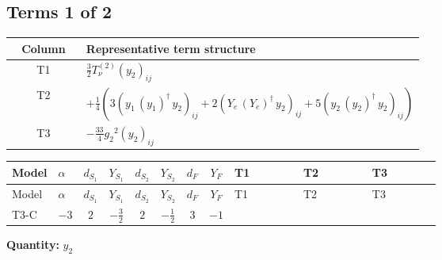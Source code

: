 \documentclass[8pt]{article}
\begin{document}
\begin{landscape}
\subsection*{Terms 1 of 2}
\begin{center}
\begin{tabular}{@{}c >{\raggedright\arraybackslash}p{0.82\linewidth}@{}}
\toprule
Column & Representative term structure \\
\midrule
T1 & \(\displaystyle \frac{3}{2} T_{\nu}^{(2)} \left({y_2}\right)_{ij}\) \\
\midrule
T2 & \(\displaystyle +\frac{1}{4} (3 \left({y_1}\,\left({y_1}\right)^{\dagger}\,{y_2}\right)_{ij}+2 \left({Y_e}\,\left({Y_e}\right)^{\dagger}\,{y_2}\right)_{ij}+5 \left({y_2}\,\left({y_2}\right)^{\dagger}\,{y_2}\right)_{ij})\) \\
\midrule
T3 & \(\displaystyle -\frac{33}{4} {g_2}^2 \left({y_2}\right)_{ij}\) \\
\midrule
\bottomrule
\end{tabular}
\end{center}
\smallskip
\tiny
\begin{longtable}{@{}llcccccc >{\raggedright\arraybackslash}p{0.21\linewidth} >{\raggedright\arraybackslash}p{0.21\linewidth} >{\raggedright\arraybackslash}p{0.21\linewidth}@{}}
\toprule
Model & $\alpha$ & $d_{S_1}$ & $Y_{S_1}$ & $d_{S_2}$ & $Y_{S_2}$ & $d_F$ & $Y_F$ & T1 & T2 & T3 \\
\midrule
\endfirsthead
\toprule
Model & $\alpha$ & $d_{S_1}$ & $Y_{S_1}$ & $d_{S_2}$ & $Y_{S_2}$ & $d_F$ & $Y_F$ & T1 & T2 & T3 \\
\midrule
\endhead
T3-C & $-3$ & $2$ & $-\frac{3}{2}$ & $2$ & $-\frac{1}{2}$ & $3$ & $-1$ & \scriptsize\adjustbox{max width=\linewidth}{$\begin{gathered} \frac{3}{2} T_{\nu}^{(2)} \left({y_2}\right)_{ij}\end{gathered}$} & \scriptsize\adjustbox{max width=\linewidth}{$\begin{gathered} +\frac{1}{4} (3 \left({y_1}\,\left({y_1}\right)^{\dagger}\,{y_2}\right)_{ij}+2 \left({Y_e}\,\left({Y_e}\right)^{\dagger}\,{y_2}\right)_{ij}+5 \left({y_2}\,\left({y_2}\right)^{\dagger}\,{y_2}\right)_{ij})\end{gathered}$} & \scriptsize\adjustbox{max width=\linewidth}{$\begin{gathered} -\frac{33}{4} {g_2}^2 \left({y_2}\right)_{ij}\end{gathered}$} \\
\midrule
\bottomrule
\end{longtable}
\clearpage
\noindent\textbf{Quantity: }$y_2$\par\smallskip

\end{landscape}
\end{document}
